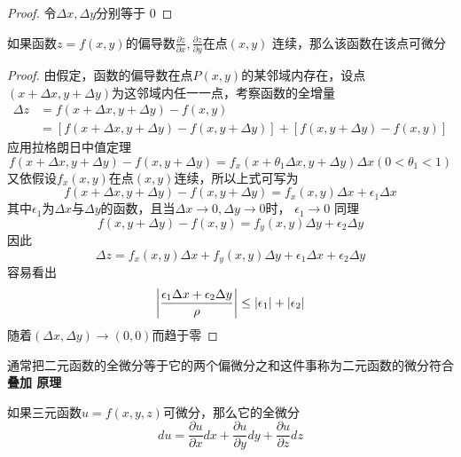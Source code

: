 \documentclass[11pt]{article}
\begin{document}
\begin{proof}
令\(\Delta x,\Delta y\)分别等于 0
\end{proof}

\begin{theorem}[充分条件]
如果函数\(z=f(x,y)\)的偏导数\(\frac{\partial z}{\partial x},\frac{\partial z}{\partial y}\)在点\((x,y)\)
连续，那么该函数在该点可微分
\end{theorem}

\begin{proof}
由假定，函数的偏导数在点\(P(x,y)\)的某邻域内存在，设点\((x+\Delta x,y+\Delta
   y)\)为这邻域内任一一点，考察函数的全增量
\begin{align*}
\Delta z&=f(x+\Delta x,y+\Delta y)-f(x,y)\\
&=[f(x+\Delta x,y+\Delta y)-f(x,y+\Delta y)]+[f(x,y+\Delta y)-f(x,y)]
\end{align*}
应用拉格朗日中值定理
\begin{equation*}
f(x+\Delta x,y+\Delta y)-f(x,y+\Delta y)=f_x(x+\theta_1\Delta x,y+\Delta y)\Delta x(0<\theta_1<1)
\end{equation*}
又依假设\(f_x(x,y)\)在点\((x,y)\)连续，所以上式可写为
\begin{equation*}
f(x+\Delta x,y+\Delta y)-f(x,y+\Delta y)=f_x(x,y)\Delta x+\epsilon_1\Delta x
\end{equation*}
其中\(\epsilon_1\)为\(\Delta x\)与\(\Delta y\)的函数，且当\(\Delta x\to0,\Delta y\to0\)时，
\(\epsilon_1\to0\)
同理
\begin{equation*}
f(x,y+\Delta y)-f(x,y)=f_y(x,y)\Delta y+\epsilon_2\Delta y
\end{equation*}
因此
\begin{equation*}
\Delta z=f_x(x,y)\Delta x+f_y(x,y)\Delta y+\epsilon_1\Delta x+\epsilon_2\Delta y
\end{equation*}
容易看出
\begin{equation*}
\abs{\frac{\epsilon_1\Delta x+\epsilon_2\Delta y}{\rho}}\le\abs{\epsilon_1}+\abs{\epsilon_2}
\end{equation*}
随着\((\Delta x,\Delta y)\to(0,0)\)而趋于零
\end{proof}

通常把二元函数的全微分等于它的两个偏微分之和这件事称为二元函数的微分符合 \textbf{叠加
原理}

如果三元函数\(u=f(x,y,z)\)可微分，那么它的全微分
\begin{equation*}
du=\frac{\partial u}{\partial x}dx+\frac{\partial u}{\partial y}dy+\frac{\partial u}{\partial z}dz
\end{equation*}
\end{document}
